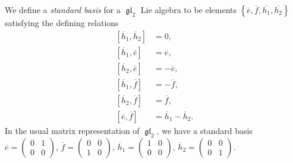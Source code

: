 \documentclass[11pt,letterpaper]{amsart}
\numberwithin{thecounter}{section}
\theoremstyle{definition}
\DeclareMathOperator{\gl}{\mathfrak{gl}}
\newcommand{\e}{\overline{e}}
\newcommand{\f}{\overline{f}}
\begin{document}
We define a \emph{standard basis} for a $\gl_2$ Lie algebra to be elements
$\left\{\overline{e},\overline{f},\overline{h_1},\overline{h_2} \right\}$ satisfying the %
defining relations 
\begin{align*}
\tag{gl:1e}\label{gl2-h1h2}
  \left[\overline{h}_1,\overline{h}_2 \right]&=0,\\
\tag{gl:4a}\label{gl2-h1e}
  \left[\overline{h}_1,\e \right] &=  \e,\\
\tag{gl:4b}\label{gl2-h2e}
  \left[\overline{h}_2, \e \right] &= -\e,\\
\tag{gl:4c}\label{gl2-h1f}
  \left[\overline{h}_1,\f \right] &= - \f,\\
\tag{gl:4d}\label{gl2-h2f}
  \left[\overline{h}_2,\f \right] &= \f,\\
\tag{gl:5}\label{gl2-ef}
  \left[\e,\f \right]&=\overline{h}_1-\overline{h}_2.
\end{align*}
In the usual matrix representation of $\gl_2$, we have a standard basis
$\overline{e}=\left(\begin{smallmatrix} 0&1\\0&0\end{smallmatrix}\right)$,
$\overline{f}=\left(\begin{smallmatrix} 0&0\\1&0\end{smallmatrix}\right)$,
$\overline{h}_1=\left(\begin{smallmatrix} 1&0\\0&0\end{smallmatrix}\right)$,
$\overline{h}_2=\left(\begin{smallmatrix} 0&0\\0&1\end{smallmatrix}\right)$.


%
\end{document}
